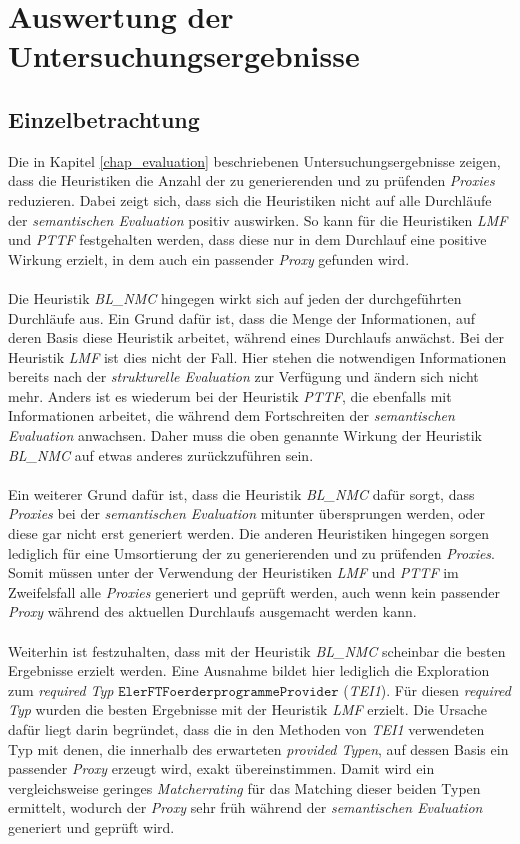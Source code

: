 \section{Auswertung der Untersuchungsergebnisse}
\subsection{Einzelbetrachtung}\label{disc_einzel}
Die in Kapitel \ref{chap_evaluation} beschriebenen Untersuchungsergebnisse zeigen, dass die \Gls{Heuristik}en die Anzahl der zu generierenden und zu prüfenden \emph{Proxies} reduzieren. Dabei zeigt sich, dass sich die \Gls{Heuristik}en nicht auf alle Durchläufe der \emph{semantischen Evaluation} positiv auswirken. So kann für die \Gls{Heuristik}en \emph{LMF} und \emph{PTTF} festgehalten werden, dass diese nur in dem Durchlauf eine positive Wirkung erzielt, in dem auch ein passender \emph{Proxy} gefunden wird.
\\\\
Die \Gls{Heuristik} \emph{BL\_NMC} hingegen wirkt sich auf jeden der durchgeführten Durchläufe aus. Ein Grund dafür ist, dass die Menge der Informationen, auf deren Basis diese \Gls{Heuristik} arbeitet, während eines Durchlaufs anwächst. Bei der \Gls{Heuristik} \emph{LMF} ist dies nicht der Fall. Hier stehen die notwendigen Informationen bereits nach der \emph{strukturelle Evaluation} zur Verfügung und ändern sich nicht mehr. Anders ist es wiederum bei der Heuristik \emph{PTTF}, die ebenfalls mit Informationen arbeitet, die während dem Fortschreiten der \emph{semantischen Evaluation} anwachsen. Daher muss die oben genannte Wirkung der \Gls{Heuristik} \emph{BL\_NMC} auf etwas anderes zurückzuführen sein. 
\\\\
Ein weiterer Grund dafür ist, dass die Heuristik \emph{BL\_NMC} dafür sorgt, dass \emph{Proxies} bei der \emph{semantischen Evaluation} mitunter übersprungen werden, oder diese gar nicht erst generiert werden. Die anderen \Gls{Heuristik}en hingegen sorgen lediglich für eine Umsortierung der zu generierenden und zu prüfenden \emph{Proxies}. Somit müssen unter der Verwendung der \Gls{Heuristik}en  \emph{LMF} und \emph{PTTF} im Zweifelsfall alle \emph{Proxies} generiert und geprüft werden, auch wenn kein passender \emph{Proxy} während des aktuellen Durchlaufs ausgemacht werden kann.
\\\\
Weiterhin ist festzuhalten, dass mit der \Gls{Heuristik} \emph{BL\_NMC} scheinbar die besten Ergebnisse erzielt werden. Eine Ausnahme bildet hier lediglich die Exploration zum \emph{required Typ} $\texttt{ElerFTFoerderprogrammeProvider}$ (\emph{TEI1}). Für diesen \emph{required Typ} wurden die besten Ergebnisse mit der \Gls{Heuristik} \emph{LMF} erzielt. Die Ursache dafür liegt darin begründet, dass die in den Methoden von \emph{TEI1} verwendeten Typ mit denen, die innerhalb des erwarteten \emph{provided Typen}, auf dessen Basis ein passender \emph{Proxy} erzeugt wird, exakt übereinstimmen. Damit wird ein vergleichsweise geringes \emph{Matcherrating} für das Matching dieser beiden Typen ermittelt, wodurch der \emph{Proxy} sehr früh während der \emph{semantischen Evaluation} generiert und geprüft wird.
